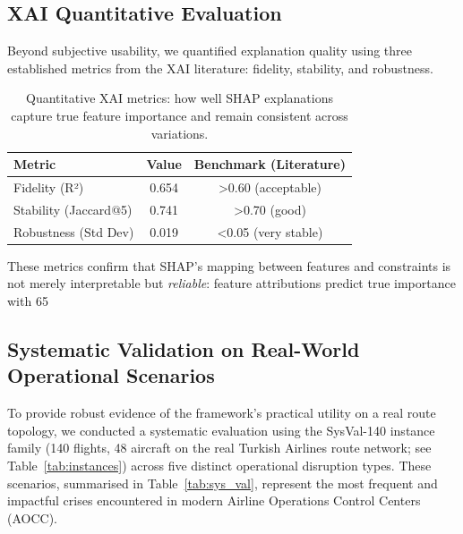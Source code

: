 \documentclass[12pt,number]{elsarticle}
\begin{document}
\subsection{XAI Quantitative Evaluation}

Beyond subjective usability, we quantified explanation quality using three established metrics from the XAI literature: fidelity, stability, and robustness.

\begin{table}[H]
\centering
\caption{Quantitative XAI metrics: how well SHAP explanations capture true feature importance and remain consistent across variations.}
\label{tab:xai_metrics}
\begin{tabular}{@{}lcc@{}}
\toprule
\textbf{Metric} & \textbf{Value} & \textbf{Benchmark (Literature)} \\
\midrule
Fidelity (R²) & 0.654 & >0.60 (acceptable) \\
Stability (Jaccard@5) & 0.741 & >0.70 (good) \\
Robustness (Std Dev) & 0.019 & <0.05 (very stable) \\
\bottomrule
\end{tabular}
\end{table}

These metrics confirm that SHAP's mapping between features and constraints is not merely interpretable but \emph{reliable}: feature attributions predict true importance with 65%

\subsection{Systematic Validation on Real-World Operational Scenarios}
\label{sec:sys_val}

To provide robust evidence of the framework's practical utility on a real route topology, we conducted a systematic evaluation using the SysVal-140 instance family (140 flights, 48 aircraft on the real Turkish Airlines route network; see Table~\ref{tab:instances}) across five distinct operational disruption types. These scenarios, summarised in Table~\ref{tab:sys_val}, represent the most frequent and impactful crises encountered in modern Airline Operations Control Centers (AOCC).
\end{document}
